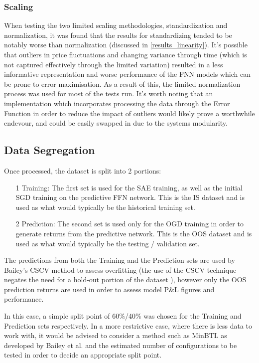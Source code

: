 \documentclass[a4paper,11pt,oneside]{article}
\theoremstyle{plain}
\theoremstyle{definition}
\begin{document}
\subsubsection {Scaling} When testing the two limited scaling methodologies, standardization and normalization, it was found that the results for standardizing tended to be notably worse than normalization (discussed in \ref{results_linearity}). It's possible that outliers in price fluctuations and changing variance through time (which is not captured effectively through the limited variation) resulted in a less informative representation and worse performance of the FNN models which can be prone to error maximisation. As a result of this, the limited normalization process was used for most of the tests run. It's worth noting that an implementation which incorporates processing the data through the Error Function in order to reduce the impact of outliers would likely prove a worthwhile endevour, and could be easily swapped in due to the systems modularity.\newline


\subsection{Data Segregation}\label{proc_dataseg}

Once processed, the dataset is split into 2 portions: 
\begin{itemize}
	\item[1] Training: The first set is used for the SAE training, as well as the initial SGD training on the predictive FFN network. This is the IS dataset and is used as what would typically be the historical training set.
	\item[2] Prediction: The second set is used only for the OGD training in order to generate returns from the predictive network. This is the OOS dataset and is used as what would typically be the testing / validation set.
\end{itemize}

The predictions from both the Training and the Prediction sets are used by Bailey's CSCV method to assess overfitting (the use of the CSCV technique negates the need for a hold-out portion of the dataset \cite{BailyPBO}), however only the OOS prediction returns are used in order to assess model P\&L figures and performance. \newline

In this case, a simple split point of 60\%/40\% was chosen for the Training and Prediction sets respectively. In a more restrictive case, where there is less data to work with, it would be advised to consider a method such as MinBTL as developed by Bailey et al. \cite{BaileyBTL} and the estimated number of configurations to be tested in order to decide an appropriate split point.
\end{document}
